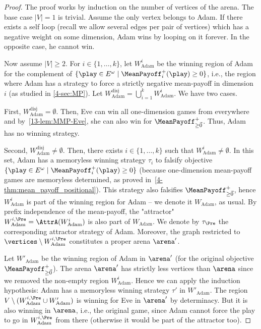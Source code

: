 \begin{proof}
The proof works by induction on the number of vertices of the arena. The base case $\vert V\vert = 1$ is trivial. Assume the only vertex belongs to Adam. If there exists a self loop (recall we allow several edges per pair of vertices) which has a negative weight on some dimension, Adam wins by looping on it forever. In the opposite case, he cannot win.

Now assume $\vert V\vert \geq 2$. For $i \in \{1,\ldots,k\}$, let $W^i_{\text{Adam}}$ be the winning region of Adam for the complement of $\{\play \in E^\omega \mid \MeanPayoff^{+}_{i}(\play) \geq 0\}$, i.e., the region where Adam has a strategy to force a strictly negative mean-payoff in dimension $i$ (as studied in \cref{4-sec:MP}). Let $W^{\text{disj}}_{\text{Adam}} = \bigcup_{i = 1}^{k} W^i_{\text{Adam}}$. We have two cases.

First, $W^{\text{disj}}_{\text{Adam}} = \emptyset$. Then, Eve can win all one-dimension games from everywhere and by~\cref{13-lem:MMP-Eve}, she can also win for $\MeanPayoff^{+}_{\geq \vec{0}}$. Thus, Adam has no winning strategy.

Second, $W^{\text{disj}}_{\text{Adam}} \neq \emptyset$. Then, there exists $i \in \{1,\ldots,k\}$ such that $W^i_{\text{Adam}} \neq \emptyset$. In this set, Adam has a memoryless winning strategy $\tau_i$ to falsify objective $\{\play \in E^\omega \mid \MeanPayoff^{+}_{i}(\play) \geq 0\}$ (because one-dimension mean-payoff games are memoryless determined, as proved in~\cref{4-thm:mean_payoff_positional}). This strategy also falsifies $\MeanPayoff^{+}_{\geq \vec{0}}$, hence $W^i_{\text{Adam}}$ is part of the winning region for Adam -- we denote it $W_{\text{Adam}}$, as usual.
By prefix independence of the mean-payoff, the "attractor" $W^{i, \Pre}_{\text{Adam}}= \AttrA(W^i_{\text{Adam}})$ is also part of $W_{\text{Adam}}$. We denote by $\tau_\Pre$ the corresponding attractor strategy of Adam. Moreover, the graph restricted to $\vertices \setminus W^{i, \Pre}_{\text{Adam}}$ constitutes a proper arena $\arena'$.

Let $W'_{\text{Adam}}$ be the winning region of Adam in $\arena'$ (for the original objective $\MeanPayoff^{+}_{\geq \vec{0}}$). The arena $\arena'$ has strictly less vertices than $\arena$ since we removed the non-empty region $W^i_{\text{Adam}}$. Hence we can apply the induction hypothesis: Adam has a memoryless winning strategy $\tau'$ in $W'_{\text{Adam}}$. The region $V \setminus (W^{i, \Pre}_{\text{Adam}} \cup W'_{\text{Adam}})$ is winning for Eve in $\arena'$ by determinacy. But it is also winning in $\arena$, i.e., the original game, since Adam cannot force the play to go in $W^{i, \Pre}_{\text{Adam}}$ from there (otherwise it would be part of the attractor too).


\end{proof}
